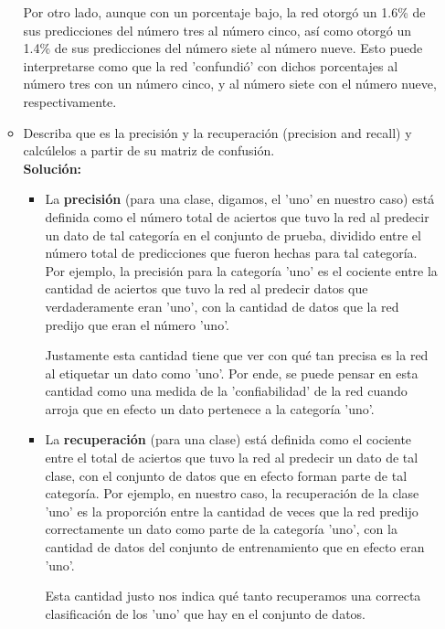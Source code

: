 \documentclass[letterpaper]{article}
\newcommand{\1}{\mathds{1}}
\theoremstyle{definition}
\theoremstyle{definition}
\theoremstyle{definition}
\theoremstyle{definition}
\theoremstyle{definition}
\begin{document}
\begin{itemize}
\begin{itemize}
         Por otro lado, aunque con un porcentaje bajo, la red otorgó un 1.6\% de sus predicciones del número tres al número cinco, así como otorgó un 1.4\% de sus predicciones 
         del número siete al número nueve. Esto puede interpretarse como que la red 'confundió' con dichos porcentajes al número tres con un número cinco, y al número siete con el número 
         nueve, respectivamente.
        \item Describa que es la precisión y la recuperación (precision and recall) y calcúlelos a partir de su 
        matriz de confusión.\\

        \textbf{Solución:} 
    \begin{itemize}
        \item La \textbf{precisión} (para una clase, digamos, el 'uno' en nuestro caso) está definida como el número total de aciertos que tuvo la red 
        al predecir un dato de tal categoría en el conjunto de prueba, dividido entre el número total de predicciones que fueron hechas para tal categoría. Por ejemplo, la precisión para la 
        categoría 'uno' es el cociente entre la cantidad de aciertos que tuvo la red al predecir datos que verdaderamente eran 'uno', con la cantidad de datos que la red predijo que
        eran el número 'uno'.

        Justamente esta cantidad tiene que ver con qué tan precisa es la red al etiquetar un dato como 'uno'. Por ende, se puede pensar en esta cantidad como una medida de la 
        'confiabilidad' de la red cuando arroja que en efecto un dato pertenece a la categoría 'uno'.
        \item La \textbf{recuperación} (para una clase) está definida como el cociente entre el total de aciertos que tuvo la red al predecir un dato de tal clase, con el conjunto de 
        datos que en efecto forman parte de tal categoría. Por ejemplo, en nuestro caso, la recuperación de la clase 'uno' es la proporción entre la cantidad de veces que la red predijo 
        correctamente un dato como parte de la categoría 'uno', con la cantidad de datos del conjunto de entrenamiento que en efecto eran 'uno'. 
        \newline

        Esta cantidad justo nos indica qué tanto recuperamos una correcta clasificación de los 'uno' que hay en el conjunto de datos. 
    \end{itemize}


\end{itemize}
\end{itemize}
\end{document}
